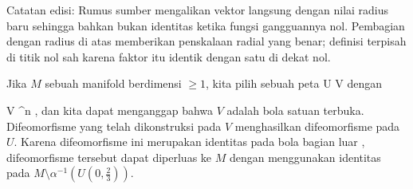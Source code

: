 Catatan edisi: Rumus sumber mengalikan vektor langsung dengan nilai radius baru sehingga bahkan bukan identitas ketika fungsi gangguannya nol. Pembagian dengan radius di atas memberikan penskalaan radial yang benar; definisi terpisah di titik nol sah karena faktor itu identik dengan satu di dekat nol.

Jika $M$ sebuah manifold berdimensi $\geq 1$, kita pilih sebuah peta
\maabbdisp {\alpha} { U } {V
} {}
dengan

\mavergleichskette
{\vergleichskette
{ V
}
{ \subseteq }{  \R^n
}
{  }{
}
{    }{
}
{   }{
}
}
{}{}{,}
dan kita dapat menganggap
 {} {}
bahwa $V$
 {} {}
adalah bola satuan terbuka. Difeomorfisme yang telah dikonstruksi pada $V$ menghasilkan difeomorfisme pada $U$. Karena difeomorfisme ini merupakan identitas pada bola bagian luar
 {} {},
difeomorfisme tersebut dapat diperluas ke $M$ dengan menggunakan identitas pada $M \setminus \alpha^{-1} \left(  U \left(   0 , { \frac{   2 }{  3 } }   \right)  \right)$.
